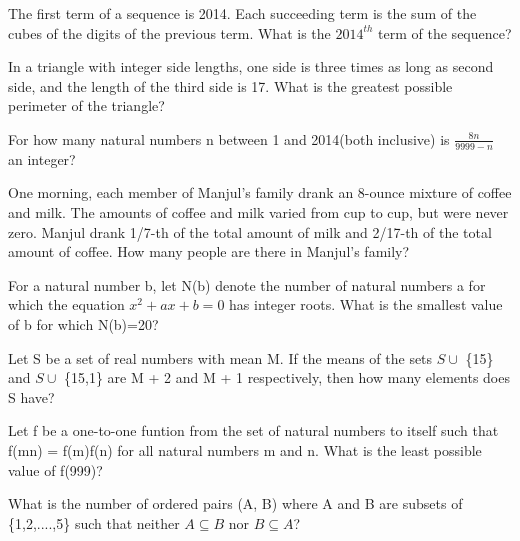 \item The first term of a sequence is 2014. Each succeeding term is the sum of the cubes of the digits of the previous term. What is the $2014^{th}$ term of the sequence?

\item In a triangle with integer side lengths, one side is three times as long as second side, and the length of the third side is 17. What is the greatest possible perimeter of the triangle?

\item For how many natural numbers n between 1 and 2014(both inclusive) is $\frac{8n}{9999 - n}$ an integer?

\item One morning, each member of Manjul's family drank an 8-ounce mixture of coffee and milk. The amounts of coffee and milk varied from cup to cup, but were never zero. Manjul drank 1/7-th of the total amount of milk and 2/17-th of the total amount of coffee. How many people are there in Manjul's family?

\item For a natural number b, let N(b) denote the number of natural numbers a for which the equation $x^2 + ax + b = 0$ has integer roots. What is the smallest value of b for which N(b)=20?

\item Let S be a set of real numbers with mean M. If the means of the sets $S \cup $ \{15\} and $S \cup $ \{15,1\} are 
M + 2 and M + 1 respectively, then how many elements does S have?

\item Let f be a one-to-one funtion from the set of natural numbers to itself such that f(mn) = f(m)f(n) for all natural numbers m and n. What is the least possible value of f(999)?

\item What is the number of ordered pairs (A, B) where A and B are subsets of \{1,2,....,5\} such that neither 
$A \subseteq B$ nor $B \subseteq A$?
